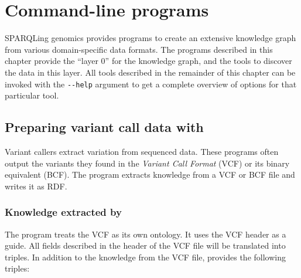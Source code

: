 \chapter{Command-line programs}
\label{chap:command-line}

  SPARQLing genomics provides programs to create an extensive knowledge graph
  from various domain-specific data formats.  The programs described in this
  chapter provide the ``layer 0'' for the knowledge graph, and the tools to
  discover the data in this layer.   All tools described in the remainder of
  this chapter can be invoked with the \texttt{-{}-help} argument to get a
  complete overview of options for that particular tool.

\section{Preparing variant call data with }
\label{sec:vcf2rdf}

  Variant callers extract variation from sequenced data.  These programs
  often output the variants they found in the \emph{Variant Call Format}
  (VCF) or its binary equivalent (BCF).  The  program
  extracts knowledge from a VCF or BCF file and writes it as RDF.

\subsection{Knowledge extracted by }

  The program treats the VCF as its own ontology.  It uses the VCF header as
  a guide.  All fields described in the header of the VCF file will be
  translated into triples.  In addition to the knowledge from the VCF file,
   provides the following triples:

